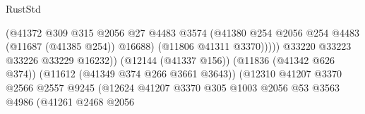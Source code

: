 \begin{lexlean}{RustStd}
\begin{coremodule}
                                                          (@41372
                                                            @309
                                                            @315
                                                            @2056
                                                            @27
                                                            @4483
                                                            @3574
                                                            (@41380
                                                              @254
                                                              @2056
                                                              @254
                                                              @4483
                                                              (@11687 (@41385 @254))
                                                              @16688)
                                                            (@11806 @41311 @3370)))))
                                                    @33220
                                                    @33223
                                                    @33226
                                                    @33229
                                                    @16232))
                                                (@12144 (@41337 @156))
                                                (@11836 (@41342 @626 @374))
                                                (@11612 (@41349 @374 @266 @3661 @3643))
                                                (@12310
                                                  @41207
                                                  @3370
                                                  @2566
                                                  @2557
                                                  @9245
                                                  (@12624
                                                    @41207
                                                    @3370
                                                    @305
                                                    @1003
                                                    @2056
                                                    @53
                                                    @3563
                                                    @4986
                                                    (@41261
                                                      @2468
                                                      @2056

\end{coremodule}
\end{lexlean}
